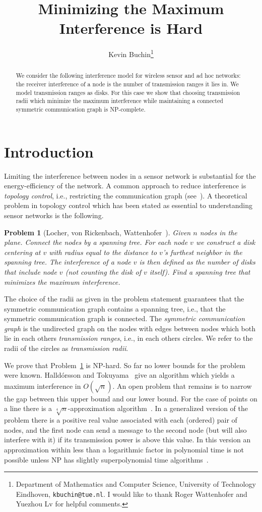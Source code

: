 \documentclass{article}
\title{Minimizing the Maximum Interference is Hard}\author{Kevin Buchin\thanks{Department of Mathematics and Computer Science, University of Technology Eindhoven, {\tt kbuchin@tue.nl}. I would like to thank Roger Wattenhofer and Yuezhou Lv for helpful comments.}}\date{}
\theoremstyle{plain}
\newtheorem{prb}{Problem}
\theoremstyle{definition}
\theoremstyle{remark}
\begin{document}
\maketitle

\begin{abstract}
We consider the following interference model for wireless sensor and ad hoc networks:
the receiver interference of a node is the number of transmission ranges it lies in.
We model transmission ranges as disks. For this case we show that
choosing transmission radii which
minimize the maximum interference while maintaining a connected symmetric
communication graph is NP-complete.
\end{abstract}

\section{Introduction}
Limiting the interference between nodes in a sensor network is substantial
for the energy-efficiency of the network. A common approach to reduce
interference is \emph{topology control}, i.e., restricting the communication
graph (see~\cite{bb-tc-07,k-isnr-07}). A theoretical problem in topology control which has been stated as
essential to understanding sensor networks is the following.

\begin{prb}[Locher, von Rickenbach, Wattenhofer~\cite{lrw-sncp-08}]\label{prb:tc}
Given $n$ nodes in the plane. Connect the nodes by a spanning tree.
For each node $v$ we construct a disk centering at $v$ with radius equal
to the distance to $v$'s furthest neighbor in the spanning tree. The interference
of a node $v$ is then defined as the number of disks that include node $v$
(not counting the disk of $v$ itself). Find
a spanning tree that minimizes the maximum interference.
\end{prb}
The choice of the radii as given in the problem statement guarantees that
the symmetric communication graph contains a spanning tree, i.e., that
the symmetric communication graph is connected.
The \emph{symmetric communication graph} is the undirected graph on the nodes
with edges between nodes which both lie in each others
\emph{transmission ranges}, i.e., in each others circles. We refer to the
radii of the circles as \emph{transmission radii}.

We prove that Problem~\ref{prb:tc} is NP-hard.
So far no lower bounds for the problem were known. Halld{\'o}rsson and
Tokuyama~\cite{ht-miwan-06} give an algorithm which yields a
maximum interference in $O(\sqrt{n})$.
An open problem that remains is to narrow the gap between this upper bound and
our lower bound.
For the case of points on a line there is a
$\sqrt[4]{n}$-approximation algorithm~\cite{rswz-rim-05}.
In a generalized version of the problem there is a positive real value
associated with each (ordered) pair of nodes, and the first node can send a message
to the second node (but will also interfere with it) if its transmission power is above this
value. In this version an approximation within less than a logarithmic factor in polynomial
time is not possible unless NP has slightly superpolynomial time algorithms~\cite{bp-cmi-06}.
\end{document}
